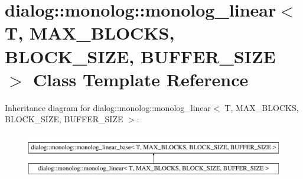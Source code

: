 \hypertarget{classdialog_1_1monolog_1_1monolog__linear}{}\section{dialog\+:\+:monolog\+:\+:monolog\+\_\+linear$<$ T, M\+A\+X\+\_\+\+B\+L\+O\+C\+KS, B\+L\+O\+C\+K\+\_\+\+S\+I\+ZE, B\+U\+F\+F\+E\+R\+\_\+\+S\+I\+ZE $>$ Class Template Reference}
\label{classdialog_1_1monolog_1_1monolog__linear}
Inheritance diagram for dialog\+:\+:monolog\+:\+:monolog\+\_\+linear$<$ T, M\+A\+X\+\_\+\+B\+L\+O\+C\+KS, B\+L\+O\+C\+K\+\_\+\+S\+I\+ZE, B\+U\+F\+F\+E\+R\+\_\+\+S\+I\+ZE $>$\+:\begin{figure}[H]
\begin{center}
\leavevmode
\includegraphics[height=2.000000cm]{classdialog_1_1monolog_1_1monolog__linear}
\end{center}
\end{figure}
